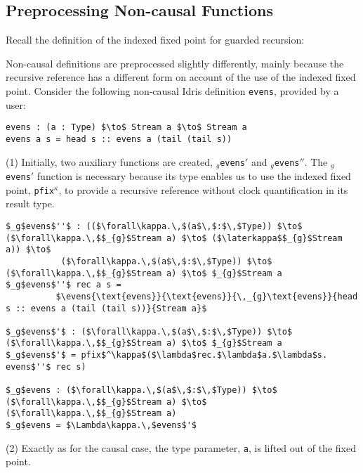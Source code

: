 \subsection{Preprocessing Non-causal Functions}
Recall the definition of the indexed fixed point for guarded recursion:
\begin{center}
  
\end{center}
Non-causal definitions are preprocessed slightly differently, mainly because the
recursive reference has a different form on account of the use of the indexed
fixed point. Consider the following non-causal Idris definition \texttt{evens},
provided by a user:
\begin{lstlisting}[mathescape, title=\idrisBlock]
evens : (a : Type) $\to$ Stream a $\to$ Stream a
evens a s = head s :: evens a (tail (tail s))
\end{lstlisting}
(1) Initially, two auxiliary functions are created, \texttt{$_{g}$evens$'$} and
\texttt{$_{g}$evens$''$}. The \texttt{$_{g}$evens$'$} function is necessary because its type
enables us to use the indexed fixed point, \texttt{pfix$^\kappa$}, to provide a recursive reference
without clock quantification in its result type.
\begin{lstlisting}[mathescape, title=\ttBlock]
$_g$evens$''$ : (($\forall\kappa.\,$(a$\,$:$\,$Type)) $\to$ ($\forall\kappa.\,$$_{g}$Stream a) $\to$ ($\laterkappa$$_{g}$Stream a)) $\to$ 
           ($\forall\kappa.\,$(a$\,$:$\,$Type)) $\to$ ($\forall\kappa.\,$$_{g}$Stream a) $\to$ $_{g}$Stream a
$_g$evens$''$ rec a s = 
          $\evens{\text{evens}}{\text{evens}}{\,_{g}\text{evens}}{head s :: evens a (tail (tail s))}{Stream a}$

$_g$evens$'$ : ($\forall\kappa.\,$(a$\,$:$\,$Type)) $\to$ ($\forall\kappa.\,$$_{g}$Stream a) $\to$ $_{g}$Stream a
$_g$evens$'$ = pfix$^\kappa$($\lambda$rec.$\lambda$a.$\lambda$s. evens$''$ rec s)

$_g$evens : ($\forall\kappa.\,$(a$\,$:$\,$Type)) $\to$ ($\forall\kappa.\,$$_{g}$Stream a) $\to$ ($\forall\kappa.\,$$_{g}$Stream a)
$_g$evens = $\Lambda\kappa.\,$evens$'$
\end{lstlisting}
(2) Exactly as for the causal case, the type parameter, \texttt{a}, is lifted out of the fixed point.
